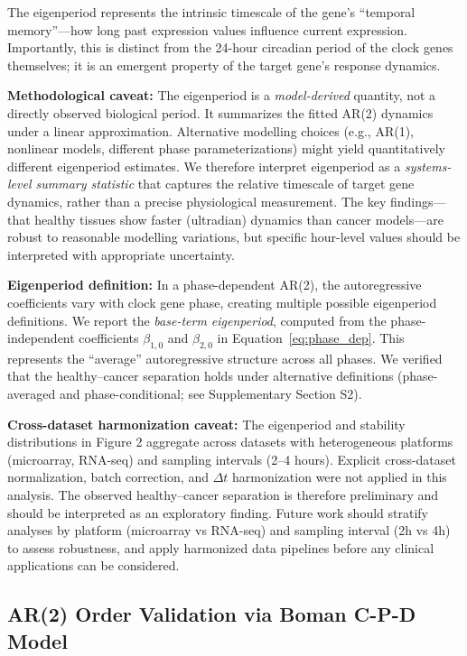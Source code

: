 \documentclass[11pt,a4paper]{article}
\begin{document}
The eigenperiod represents the intrinsic timescale of the gene's ``temporal memory''---how long past expression values influence current expression. Importantly, this is distinct from the 24-hour circadian period of the clock genes themselves; it is an emergent property of the target gene's response dynamics.

\textbf{Methodological caveat:} The eigenperiod is a \textit{model-derived} quantity, not a directly observed biological period. It summarizes the fitted AR(2) dynamics under a linear approximation. Alternative modelling choices (e.g., AR(1), nonlinear models, different phase parameterizations) might yield quantitatively different eigenperiod estimates. We therefore interpret eigenperiod as a \textit{systems-level summary statistic} that captures the relative timescale of target gene dynamics, rather than a precise physiological measurement. The key findings---that healthy tissues show faster (ultradian) dynamics than cancer models---are robust to reasonable modelling variations, but specific hour-level values should be interpreted with appropriate uncertainty.

\textbf{Eigenperiod definition:} In a phase-dependent AR(2), the autoregressive coefficients vary with clock gene phase, creating multiple possible eigenperiod definitions. We report the \textit{base-term eigenperiod}, computed from the phase-independent coefficients $\beta_{1,0}$ and $\beta_{2,0}$ in Equation~\ref{eq:phase_dep}. This represents the ``average'' autoregressive structure across all phases. We verified that the healthy--cancer separation holds under alternative definitions (phase-averaged and phase-conditional; see Supplementary Section S2).

\textbf{Cross-dataset harmonization caveat:} The eigenperiod and stability distributions in Figure 2 aggregate across datasets with heterogeneous platforms (microarray, RNA-seq) and sampling intervals (2--4 hours). Explicit cross-dataset normalization, batch correction, and $\Delta t$ harmonization were not applied in this analysis. The observed healthy--cancer separation is therefore preliminary and should be interpreted as an exploratory finding. Future work should stratify analyses by platform (microarray vs RNA-seq) and sampling interval (2h vs 4h) to assess robustness, and apply harmonized data pipelines before any clinical applications can be considered.

\subsection{AR(2) Order Validation via Boman C-P-D Model}
\end{document}
